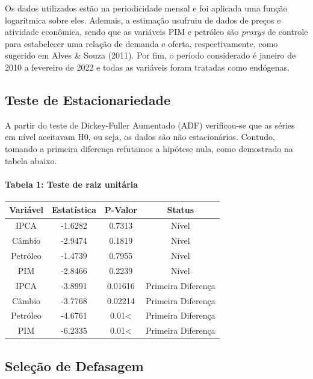 \documentclass[12pt]{article}
\begin{document}
Os dados utilizados estão na periodicidade mensal e foi aplicada uma
função logarítmica sobre eles. Ademais, a estimação usufruiu de dados de
preços e atividade econômica, sendo que as variáveis PIM e petróleo são
\emph{proxys} de controle para estabelecer uma relação de demanda e
oferta, respectivamente, como sugerido em Alves \& Souza (2011). Por
fim, o período considerado é janeiro de 2010 a fevereiro de 2022 e todas
as variáveis foram tratadas como endógenas.

\hypertarget{teste-de-estacionariedade}{%
\subsection{Teste de Estacionariedade}\label{teste-de-estacionariedade}}

A partir do teste de Dickey-Fuller Aumentado (ADF) verificou-se que as
séries em nível aceitavam H0, ou seja, os dados são não estacionários.
Contudo, tomando a primeira diferença refutamos a hipótese nula, como
demostrado na tabela abaixo.

\hypertarget{tabela-1-teste-de-raiz-unituxe1ria}{%
\paragraph{Tabela 1: Teste de raiz
unitária}\label{tabela-1-teste-de-raiz-unituxe1ria}}

\begin{longtable}[]{@{}cccc@{}}
\toprule
Variável & Estatística & P-Valor & Status \\
\midrule
\endhead
IPCA & -1.6282 & 0.7313 & Nível \\
Câmbio & -2.9474 & 0.1819 & Nível \\
Petróleo & -1.4739 & 0.7955 & Nível \\
PIM & -2.8466 & 0.2239 & Nível \\
IPCA & -3.8991 & 0.01616 & Primeira Diferença \\
Câmbio & -3.7768 & 0.02214 & Primeira Diferença \\
Petróleo & -4.6761 & 0.01\textless{} & Primeira Diferença \\
PIM & -6.2335 & 0.01\textless{} & Primeira Diferença \\
\bottomrule
\end{longtable}

\hypertarget{seleuxe7uxe3o-de-defasagem}{%
\subsection{Seleção de Defasagem}\label{seleuxe7uxe3o-de-defasagem}}
\end{document}
